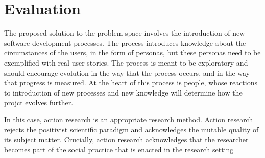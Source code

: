 
\section{Evaluation} %
\label{sec:evaluation}

The proposed solution to the problem space involves the introduction of new software development processes. The process introduces knowledge about the circumstances of the users, in the form of personas, but these personas need to be exemplified with real user stories. The process is meant to be exploratory and should encourage evolution in the way that the process occurs, and in the way that progress is measured. At the heart of this process is people, whose reactions to introduction of new processes and new knowledge will determine how the projct evolves further.

In this case, action research is an appropriate research method. Action research rejects the positivist scientific paradigm and acknowledges the mutable quality of its subject matter. Crucially, action research acknowledges that the researcher becomes part of the social practice that is enacted in the research setting


